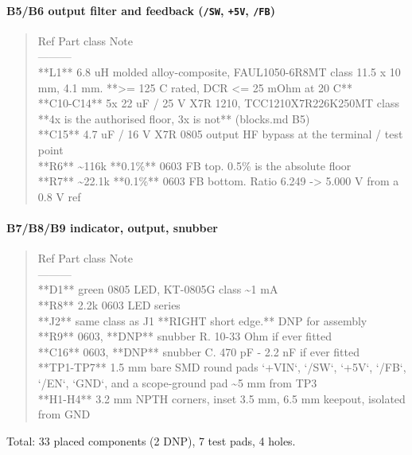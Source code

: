 \documentclass[11pt,a4paper]{article}
\begin{document}
\paragraph*{B5/B6 output filter and feedback (\texttt{/SW}, \texttt{+5V}, \texttt{/FB})}
\begin{quote}\small\ttfamily\raggedright
\textbar{} Ref \textbar{} Part class \textbar{} Note \textbar{}\\
\textbar{}---\textbar{}---\textbar{}---\textbar{}\\
\textbar{} {*}{*}L1{*}{*} \textbar{} 6.8 uH molded alloy-composite, FAUL1050-6R8MT class \textbar{} 11.5 x 10 mm, 4.1 mm. {*}{*}\textgreater{}= 125 C rated, DCR \textless{}= 25 mOhm at 20 C{*}{*} \textbar{}\\
\textbar{} {*}{*}C10-C14{*}{*} \textbar{} 5x 22 uF / 25 V X7R 1210, TCC1210X7R226K250MT class \textbar{} {*}{*}4x is the authorised floor, 3x is not{*}{*} (blocks.md B5) \textbar{}\\
\textbar{} {*}{*}C15{*}{*} \textbar{} 4.7 uF / 16 V X7R 0805 \textbar{} output HF bypass at the terminal / test point \textbar{}\\
\textbar{} {*}{*}R6{*}{*} \textbar{} \textasciitilde{}116k {*}{*}0.1\%{*}{*} 0603 \textbar{} FB top. 0.5\% is the absolute floor \textbar{}\\
\textbar{} {*}{*}R7{*}{*} \textbar{} \textasciitilde{}22.1k {*}{*}0.1\%{*}{*} 0603 \textbar{} FB bottom. Ratio 6.249 -\textgreater{} 5.000 V from a 0.8 V ref \textbar{}
\end{quote}
\paragraph*{B7/B8/B9 indicator, output, snubber}
\begin{quote}\small\ttfamily\raggedright
\textbar{} Ref \textbar{} Part class \textbar{} Note \textbar{}\\
\textbar{}---\textbar{}---\textbar{}---\textbar{}\\
\textbar{} {*}{*}D1{*}{*} \textbar{} green 0805 LED, KT-0805G class \textbar{} \textasciitilde{}1 mA \textbar{}\\
\textbar{} {*}{*}R8{*}{*} \textbar{} 2.2k 0603 \textbar{} LED series \textbar{}\\
\textbar{} {*}{*}J2{*}{*} \textbar{} same class as J1 \textbar{} {*}{*}RIGHT short edge.{*}{*} DNP for assembly \textbar{}\\
\textbar{} {*}{*}R9{*}{*} \textbar{} 0603, {*}{*}DNP{*}{*} \textbar{} snubber R. 10-33 Ohm if ever fitted \textbar{}\\
\textbar{} {*}{*}C16{*}{*} \textbar{} 0603, {*}{*}DNP{*}{*} \textbar{} snubber C. 470 pF - 2.2 nF if ever fitted \textbar{}\\
\textbar{} {*}{*}TP1-TP7{*}{*} \textbar{} 1.5 mm bare SMD round pads \textbar{} `+VIN`, `/SW`, `+5V`, `/FB`, `/EN`, `GND`, and a scope-ground pad \textasciitilde{}5 mm from TP3 \textbar{}\\
\textbar{} {*}{*}H1-H4{*}{*} \textbar{} 3.2 mm NPTH \textbar{} corners, inset 3.5 mm, 6.5 mm keepout, isolated from GND \textbar{}
\end{quote}
Total: 33 placed components (2 DNP), 7 test pads, 4 holes.
\end{document}
